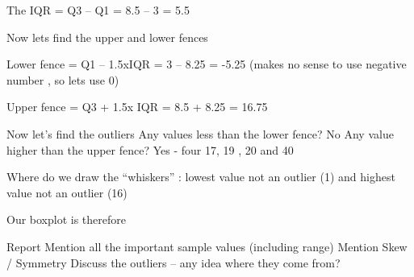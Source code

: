 The IQR = Q3 – Q1 = 8.5 – 3 = 5.5

Now lets find the upper and lower fences

Lower fence  = Q1 – 1.5xIQR	 = 3 – 8.25 = -5.25		
(makes no sense to use negative number , so lets use 0)

Upper fence = Q3 + 1.5x IQR = 8.5 + 8.25 = 16.75

Now let’s find the outliers
Any values less than the lower fence? 	No
Any value higher than the upper fence? 	Yes -  four 17, 19 , 20 and 40

Where do we draw the “whiskers” : lowest value not an outlier (1) and highest value not an outlier  (16)






Our boxplot is therefore

 

Report
Mention all the important sample values (including range)
Mention Skew / Symmetry
Discuss the outliers – any idea where they come from?

